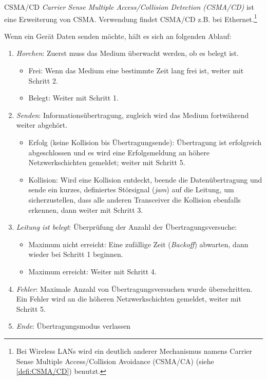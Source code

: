 \begin{defi}{CSMA/CD}
    \emph{Carrier Sense Multiple Access/Collision Detection (CSMA/CD)} ist eine Erweiterung von CSMA.
    Verwendung findet CSMA/CD z.B. bei Ethernet.\footnote{ Bei Wireless LANs wird ein deutlich anderer Mechanismus namens Carrier Sense Multiple Access/Collision Avoidance (CSMA/CA) (siehe \ref{defi:CSMA/CD}) benutzt.}

    Wenn ein Gerät Daten senden möchte, hält es sich an folgenden Ablauf:
    \begin{enumerate}
        \item \emph{Horchen}: Zuerst muss das Medium überwacht werden, ob es belegt ist.
              \begin{itemize}
                  \item Frei: Wenn das Medium eine bestimmte Zeit lang frei ist, weiter mit Schritt 2.
                  \item Belegt: Weiter mit Schritt 1.
              \end{itemize}
        \item \emph{Senden}: Informationsübertragung, zugleich wird das Medium fortwährend weiter abgehört.
              \begin{itemize}
                  \item Erfolg (keine Kollision bis Übertragungsende): Übertragung ist erfolgreich abgeschlossen und es wird eine Erfolgsmeldung an höhere Netzwerkschichten gemeldet; weiter mit Schritt 5.
                  \item Kollision: Wird eine Kollision entdeckt, beende die Datenübertragung und sende ein kurzes, definiertes Störsignal (\emph{jam}) auf die Leitung, um sicherzustellen, dass alle anderen Transceiver die Kollision ebenfalls erkennen, dann weiter mit Schritt 3.
              \end{itemize}
        \item \emph{Leitung ist belegt}: Überprüfung der Anzahl der Übertragungsversuche:
              \begin{itemize}
                  \item Maximum nicht erreicht: Eine zufällige Zeit (\emph{Backoff}) abwarten, dann wieder bei Schritt 1 beginnen.
                  \item Maximum erreicht: Weiter mit Schritt 4.
              \end{itemize}
        \item \emph{Fehler}: Maximale Anzahl von Übertragungsversuchen wurde überschritten. Ein Fehler wird an die höheren Netzwerkschichten gemeldet, weiter mit Schritt 5.
        \item \emph{Ende}: Übertragungsmodus verlassen
    \end{enumerate}
\end{defi}

